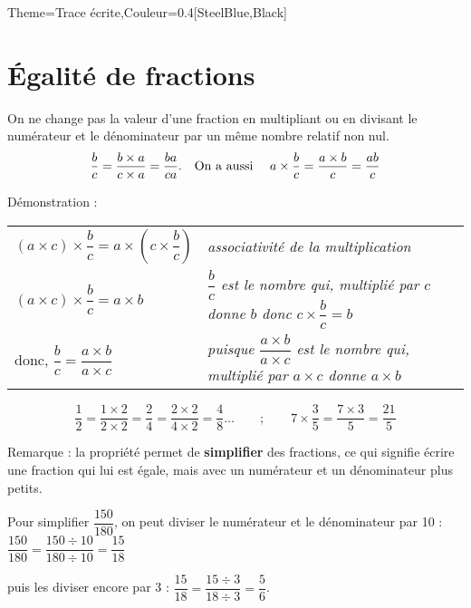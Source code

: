 \begin{Maquette}[Cours]{Theme={Trace écrite},Couleur={0.4[SteelBlue,Black]}}

   \section{Égalité de fractions}

      \begin{propriete*}{}
         On ne change pas la valeur d'une fraction en multipliant ou en divisant le numérateur et le dénominateur par un même nombre relatif non nul.
         $$\dfrac{b}{c} =\dfrac{b\times a}{c\times a}= \dfrac{ba}{ca}. \text{\quad On a aussi \quad }a\times\dfrac{b}{c}= \dfrac{a\times b}{c} =\dfrac{ab}{c}$$
      \end{propriete*}

      Démonstration :\qquad
         {
         \begin{tabular}{p{4cm}p{10cm}}
            $(a\times c)\times\dfrac{b}{c} =a\times \left(c\times\dfrac{b}{c}\right)$
            &
            {\it associativité de la multiplication} \\
            $(a\times c)\times\dfrac{b}{c} =a\times b$
            &
            {\it $\dfrac{b}{c}$ est le nombre qui, multiplié par $c$ donne $b$ donc $c\times\dfrac{b}{c} =b$} \\
            donc, $\dfrac{b}{c} =\dfrac{a\times b}{a\times c}$
            &
            {\it puisque $\dfrac{a\times b}{a\times c}$ est le nombre qui, multiplié par $a\times c$ donne $a\times b$} \\
         \end{tabular}}

      \begin{exemple*}{}   
         $$\dfrac12 =\dfrac{1\times2}{2\times2} =\dfrac24 =\dfrac{2\times2}{4\times2} = \dfrac48\dots \qquad ; \qquad 7\times\dfrac{3}{5} =\dfrac{7\times3}{5} =\dfrac{21}{5}$$
      \end{exemple*}

      Remarque : la propriété permet de {\bf simplifier} des fractions, ce qui  signifie écrire une fraction qui lui est égale, mais avec un numérateur et un dénominateur plus petits.

      \begin{exemple*}{}
         Pour simplifier $\dfrac{150}{180}$, on peut diviser le numérateur et le dénominateur par 10 : $\dfrac{150}{180} =\dfrac{150\div10}{180\div10} =\dfrac{15}{18}$ \par \smallskip
         puis les diviser encore par 3 : $\dfrac{15}{18} =\dfrac{15\div3}{18\div3} =\dfrac56$.
      \end{exemple*}



\end{Maquette}

